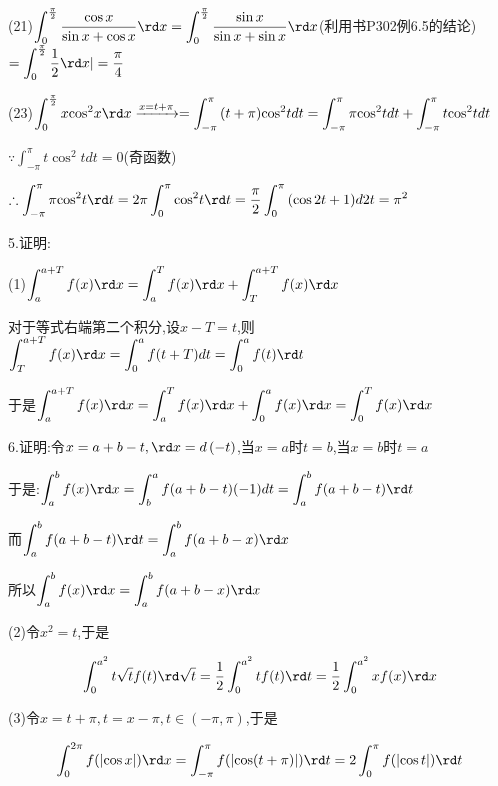 (21)$\displaystyle\int_0^{\frac{\pi }{2}} {\dfrac{{\cos x}}{{\sin x + \cos x}}} \rd x = \displaystyle\int_0^{\frac{\pi }{2}} {\dfrac{{\sin x}}{{\sin x + \sin x}}} \rd x$(利用书P302例6.5的结论)$ = \displaystyle\int_0^{\frac{\pi }{2}} {\frac{1}{2}} \rd x| = \dfrac{\pi }{4}$

(23)$\displaystyle\int_0^{\frac{\pi }{2}} {x{{\cos }^2}x} \rd x\xrightarrow{{x = t + \pi }} = \displaystyle\int_{ - \pi }^\pi  {(t + \pi ){{\cos }^2}t} dt = \displaystyle\int_{ - \pi }^\pi  {\pi {{\cos }^2}t} dt + \displaystyle\int_{ - \pi }^\pi  {t{{\cos }^2}t} dt$

$\because \displaystyle\int_{ - \pi }^\pi  {t{{\cos }^2}t} dt = 0$(奇函数)

$\therefore \displaystyle\int_{ - \pi }^\pi  {\pi {{\cos }^2}t} \rd t = 2\pi \displaystyle\int_0^\pi  {{{\cos }^2}t} \rd t = \dfrac{\pi }{2}\displaystyle\int_0^\pi  {(\cos 2t}  + 1)d2t = {\pi ^2}$

5.证明:

(1)$\displaystyle\int_a^{a + T} {f(x)} \rd x = \displaystyle\int_a^T {f(x)} \rd x + \displaystyle\int_T^{a + T} {f(x)} \rd x$

对于等式右端第二个积分,设$x - T = t$,则$\displaystyle\int_T^{a + T} {f(x)} \rd x = \displaystyle\int_0^a {f(t + T)} dt = \displaystyle\int_0^a {f(t)} \rd t$

于是$\displaystyle\int_a^{a + T} {f(x)} \rd x = \displaystyle\int_a^T {f(x)} \rd x + \displaystyle\int_0^a {f(x)} \rd x = \displaystyle\int_0^T {f(x)} \rd x$

6.证明:令$x = a + b - t,\rd x = d\left( { - t} \right)$,当$x = a$时$t = b$,当$x = b$时$t = a$

于是:$\displaystyle\int_a^b {f(x)} \rd x = \displaystyle\int_b^a {f(a + b - t)( - 1)} dt = \displaystyle\int_a^b {f(a + b - t)} \rd t$

而$\displaystyle\int_a^b {f(a + b - t)} \rd t = \displaystyle\int_a^b {f(a + b - x)} \rd x$

所以$\displaystyle\int_a^b {f(x)} \rd x = \displaystyle\int_a^b {f(a + b - x)} \rd x$

(2)令${x^2} = t$,于是

\[\displaystyle\int_0^{{a^2}} {t\sqrt t f(t)} \rd \sqrt t  = \dfrac{1}{2}\displaystyle\int_0^{{a^2}} {tf(t)} \rd t = \dfrac{1}{2}\displaystyle\int_0^{{a^2}} {xf(x)} \rd x\]

(3)令$x = t + \pi ,t = x - \pi ,t \in ( - \pi ,\pi )$,于是

\[\displaystyle\int_0^{2\pi } {f(\left| {\cos x} \right|)} \rd x = \displaystyle\int_{ - \pi }^\pi  {f(\left| {\cos (t + \pi )} \right|)} \rd t = 2\displaystyle\int_0^\pi  {f(\left| {\cos t} \right|)} \rd t\]

